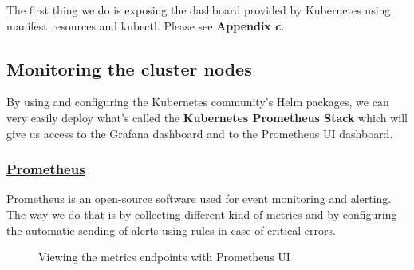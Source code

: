 The first thing we do is exposing the dashboard provided by Kubernetes using manifest resources and kubectl.
Please see \textbf{Appendix c}.

\subsection{Monitoring the cluster nodes}
By using and configuring the Kubernetes community's Helm packages, we can very easily deploy what's called the \textbf{Kubernetes Prometheus Stack} which will give us access to the Grafana dashboard and to the Prometheus UI dashboard.

\subsubsection*{\underline{Prometheus}}
Prometheus is an open-source software used for event monitoring and alerting.
The way we do that is by collecting different kind of metrics and by configuring the automatic sending of alerts using rules in case of critical errors.
\begin{figure}[H]
    \centering
    \caption{Viewing the metrics endpoints with Prometheus UI}
    \label{fig:prometheus-ui-metrics-endpoint}
\end{figure}

